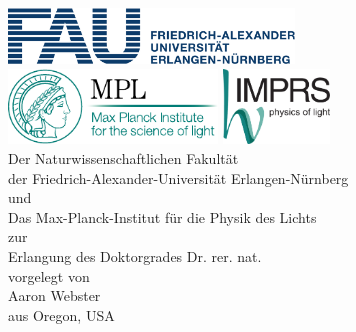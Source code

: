 \begin{titlepage}
\begin{center}
\hfill\\[2cm]
{ \Huge {\bfseries {\distitle}} \par}
\vspace{3.0cm}
\includegraphics[height=1.5cm,keepaspectratio]{images/FAU_cmyk}\\
\vspace{1cm}
\includegraphics[height=2cm,keepaspectratio]{images/Logo_MPL_englisch_kompakt_cmyk_110915}
\hspace{1cm}
\includegraphics[height=2cm,keepaspectratio]{images/Logo_IMPRS_4c_042012}
\vspace{3cm}
\\
{\Large
Der Naturwissenschaftlichen Fakultät\\
der Friedrich-Alexander-Universität Erlangen-Nürnberg\\
und\\
Das Max-Planck-Institut für die Physik des Lichts\\
\vspace{0.5cm}
zur\\
Erlangung des Doktorgrades Dr. rer. nat.\\
\vspace{0.5cm}
vorgelegt von\\
Aaron Webster\\
aus Oregon, USA
}
\end{center}
\end{titlepage}
